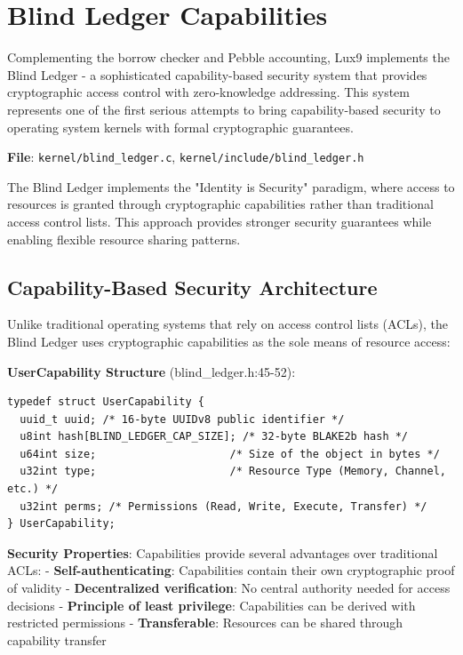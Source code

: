 \documentclass[11pt,letterpaper]{article}
\begin{document}
\section{Blind Ledger Capabilities}

Complementing the borrow checker and Pebble accounting, Lux9 implements the Blind Ledger - a sophisticated capability-based security system that provides cryptographic access control with zero-knowledge addressing. This system represents one of the first serious attempts to bring capability-based security to operating system kernels with formal cryptographic guarantees.

\textbf{File}: \texttt{kernel/blind\_ledger.c}, \texttt{kernel/include/blind\_ledger.h}

The Blind Ledger implements the "Identity is Security" paradigm, where access to resources is granted through cryptographic capabilities rather than traditional access control lists. This approach provides stronger security guarantees while enabling flexible resource sharing patterns.

\subsection{Capability-Based Security Architecture}

Unlike traditional operating systems that rely on access control lists (ACLs), the Blind Ledger uses cryptographic capabilities as the sole means of resource access:

\textbf{UserCapability Structure} (blind\_ledger.h:45-52):

\begin{lstlisting}
typedef struct UserCapability {
  uuid_t uuid; /* 16-byte UUIDv8 public identifier */
  u8int hash[BLIND_LEDGER_CAP_SIZE]; /* 32-byte BLAKE2b hash */
  u64int size;                     /* Size of the object in bytes */
  u32int type;                     /* Resource Type (Memory, Channel, etc.) */
  u32int perms; /* Permissions (Read, Write, Execute, Transfer) */
} UserCapability;
\end{lstlisting}

\textbf{Security Properties}: Capabilities provide several advantages over traditional ACLs:
- \textbf{Self-authenticating}: Capabilities contain their own cryptographic proof of validity
- \textbf{Decentralized verification}: No central authority needed for access decisions
- \textbf{Principle of least privilege}: Capabilities can be derived with restricted permissions
- \textbf{Transferable}: Resources can be shared through capability transfer
\end{document}

